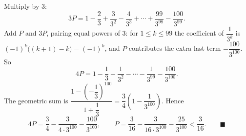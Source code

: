 Multiply by $3$:
\[
3P=1-\dfrac{2}{3}+\dfrac{3}{3^2}-\dfrac{4}{3^3}+\cdots+\dfrac{99}{3^{98}}-\dfrac{100}{3^{99}}.
\]
Add $P$ and $3P$, pairing equal powers of $3$: for $1\le k\le99$ the coefficient of $\dfrac{1}{3^k}$ is $(-1)^k\bigl((k+1)-k\bigr)=(-1)^k$, and $P$ contributes the extra last term $-\dfrac{100}{3^{100}}$. So
\[
4P=1-\dfrac{1}{3}+\dfrac{1}{3^2}-\cdots-\dfrac{1}{3^{99}}-\dfrac{100}{3^{100}}.
\]
The geometric sum is $\dfrac{1-\left(-\dfrac{1}{3}\right)^{100}}{1+\dfrac{1}{3}}=\dfrac{3}{4}\left(1-\dfrac{1}{3^{100}}\right)$. Hence
\[
4P=\dfrac{3}{4}-\dfrac{3}{4\cdot3^{100}}-\dfrac{100}{3^{100}},\qquad P=\dfrac{3}{16}-\dfrac{3}{16\cdot3^{100}}-\dfrac{25}{3^{100}}<\dfrac{3}{16}. \qquad\blacksquare
\]

